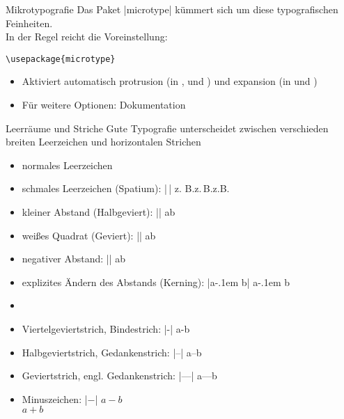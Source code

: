 \documentclass[
	vorläufig=false,
	aspectratio=1610,
	datum=2018-10-22,
	titel={Allgemeine Formatierung und Pakete},
	web=true,
	max,
]{../tex/latexkurs-slides}
\begin{document}
\begin{frame}[fragile]{Mikrotypografie}
Das Paket |microtype| kümmert sich um diese typografischen Feinheiten.\\
In der Regel reicht die Voreinstellung:
\begin{lstlisting}
\usepackage{microtype}
\end{lstlisting}
\begin{itemize}
\item Aktiviert automatisch protrusion (in , \XeTeX und ) und expansion (in  und ) 
\item Für weitere Optionen: Dokumentation
\end{itemize}
\end{frame}

\begin{frame}[fragile]{Leerräume und Striche}
	Gute Typografie unterscheidet zwischen verschieden breiten Leerzeichen und horizontalen Strichen
			\begin{itemize}
				\item normales Leerzeichen
				\item schmales Leerzeichen (Spatium): |\,| \hfill z. B.\quad z.\,B.\quad z.B.
				\item kleiner Abstand (Halbgeviert): |\enskip| \hfill a\enskip b
				\item weißes Quadrat (Geviert): |\quad| \hfill a\quad b
				\item negativer Abstand: |\!| \hfill a\!b
				\pause
				\item explizites Ändern des Abstands (Kerning): |a\kern-.1em b| \hfill a\kern-.1em b
				\item[] \pause
				\item Viertelgeviertstrich, Bindestrich: |-| \hfill a-b
				\item Halbgeviertstrich, Gedankenstrich: |--| \hfill a–b
				\item Geviertstrich, engl. Gedankenstrich: |---| \hfill a—b
				\item Minuszeichen: |$-$| \hfill $a-b$\\\hfill $a+b$
			\end{itemize}
\end{frame}
\end{document}
